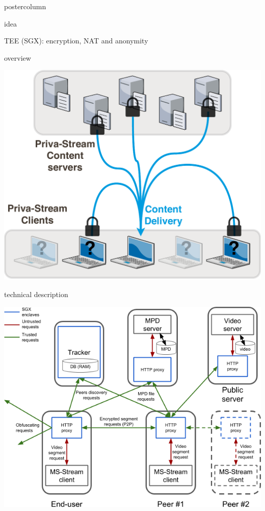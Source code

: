 \begin{frame}
\begin{columns}
\begin{column}{.49\textwidth}
\begin{beamercolorbox}[center,wd=\textwidth]{postercolumn}
\begin{minipage}[T]{.95\textwidth}
{\begin{block}{\pname idea}
\begin{itemize}
            TEE (SGX): encryption, NAT and anonymity
            
            \end{itemize}
            
            \end{block}
            
            \vfill
            
            \begin{block}{\pname overview}
            
            \centering
            
            \includegraphics[width=.925\textwidth]{sample/BP.pdf}
            
            \end{block}
            
            \vfill
            
            \begin{block}{\pname technical description}
            
            \centering
            
            \includegraphics[width=.8\textwidth]{sample/PS-tech.png}
            

\end{block}}
\end{minipage}
\end{beamercolorbox}
\end{column}
\end{columns}
\end{frame}
